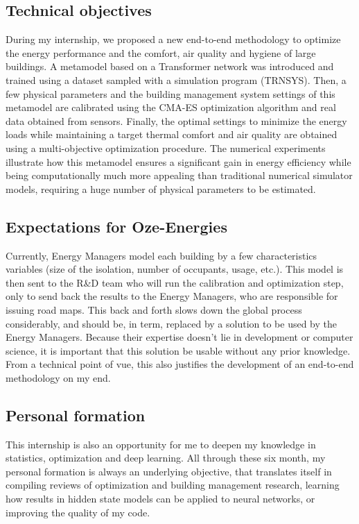 \documentclass[12pt]{article}
\begin{document}
\subsection{Technical objectives}
During my internship, we proposed a new end-to-end methodology to optimize the energy performance and the comfort, air quality and hygiene of large buildings. A metamodel based on a Transformer network was introduced and trained using a dataset sampled with a simulation program (TRNSYS). Then, a few physical parameters and the building management system settings of this metamodel are calibrated using the CMA-ES optimization algorithm and real data obtained from sensors. Finally, the optimal settings to minimize the energy loads while maintaining a target thermal comfort and air quality are obtained using a multi-objective optimization procedure. The numerical experiments illustrate how this metamodel ensures a significant gain in energy efficiency while being computationally much more appealing than traditional numerical simulator models, requiring a huge number of physical parameters to be estimated.

\subsection{Expectations for Oze-Energies}
Currently, Energy Managers model each building by a few characteristics variables (size of the isolation, number of occupants, usage, etc.). This model is then sent to the R\&D team who will run the calibration and optimization step, only to send back the results to the Energy Managers, who are responsible for issuing road maps. This back and forth slows down the global process considerably, and should be, in term, replaced by a solution to be used by the Energy Managers. Because their expertise doesn't lie in development or computer science, it is important that this solution be usable without any prior knowledge. From a technical point of vue, this also justifies the development of an end-to-end methodology on my end.

\subsection{Personal formation}
This internship is also an opportunity for me to deepen my knowledge in statistics, optimization and deep learning. All through these six month, my personal formation is always an underlying objective, that translates itself in compiling reviews of optimization and building management research, learning how results in hidden state models can be applied to neural networks, or improving the quality of my code.
\end{document}
